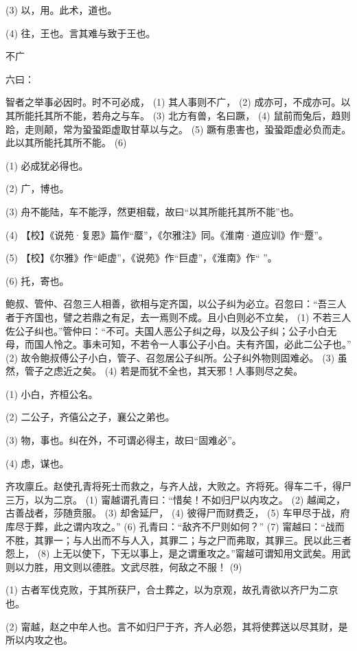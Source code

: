 \documentclass[12pt,UTF8]{ctexbook}
\begin{document}
(3) 以，用。此术，道也。

(4) 往，王也。言其难与致于王也。





不广


六曰：

智者之举事必因时。时不可必成， (1) 其人事则不广， (2) 成亦可，不成亦可。以其所能托其所不能，若舟之与车。 (3) 北方有兽，名曰蹶， (4) 鼠前而兔后，趋则跲，走则颠，常为蛩蛩距虚取甘草以与之。 (5) 蹶有患害也，蛩蛩距虚必负而走。此以其所能托其所不能。 (6)

(1) 必成犹必得也。

(2) 广，博也。

(3) 舟不能陆，车不能浮，然更相载，故曰“以其所能托其所不能”也。

(4) 【校】《说苑·复恩》篇作“蟨”，《尔雅注》同。《淮南·道应训》作“蹷”。

(5) 【校】《尔雅》作“岠虚”，《说苑》作“巨虚”，《淮南》作“ ”。

(6) 托，寄也。

鲍叔、管仲、召忽三人相善，欲相与定齐国，以公子纠为必立。召忽曰：“吾三人者于齐国也，譬之若鼎之有足，去一焉则不成。且小白则必不立矣， (1) 不若三人佐公子纠也。”管仲曰：“不可。夫国人恶公子纠之母，以及公子纠；公子小白无母，而国人怜之。事未可知，不若令一人事公子小白。夫有齐国，必此二公子也。” (2) 故令鲍叔傅公子小白，管子、召忽居公子纠所。公子纠外物则固难必。 (3) 虽然，管子之虑近之矣。 (4) 若是而犹不全也，其天邪！人事则尽之矣。

(1) 小白，齐桓公名。

(2) 二公子，齐僖公之子，襄公之弟也。

(3) 物，事也。纠在外，不可谓必得主，故曰“固难必”。

(4) 虑，谋也。

齐攻廪丘。赵使孔青将死士而救之，与齐人战，大败之。齐将死。得车二千，得尸三万，以为二京。 (1) 甯越谓孔青曰：“惜矣！不如归尸以内攻之。 (2) 越闻之，古善战者，莎随贲服。 (3) 却舍延尸， (4) 彼得尸而财费乏， (5) 车甲尽于战，府库尽于葬，此之谓内攻之。” (6) 孔青曰：“敌齐不尸则如何？” (7) 甯越曰：“战而不胜，其罪一；与人出而不与人入，其罪二；与之尸而弗取，其罪三。民以此三者怨上， (8) 上无以使下，下无以事上，是之谓重攻之。”甯越可谓知用文武矣。用武则以力胜，用文则以德胜。文武尽胜，何敌之不服！ (9)

(1) 古者军伐克败，于其所获尸，合土葬之，以为京观，故孔青欲以齐尸为二京也。

(2) 甯越，赵之中牟人也。言不如归尸于齐，齐人必怨，其将使葬送以尽其财，是所以内攻之也。
\end{document}
